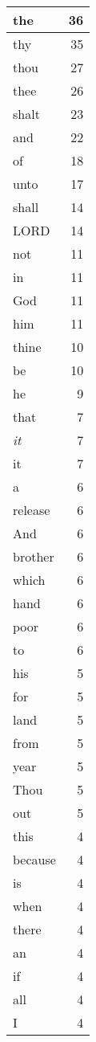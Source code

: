 \begin{center}
\begin{longtable}{l|r}
\hline \hline
\endlastfoot
the & 36 \\ \hline
thy & 35 \\ \hline
thou & 27 \\ \hline
thee & 26 \\ \hline
shalt & 23 \\ \hline
and & 22 \\ \hline
of & 18 \\ \hline
unto & 17 \\ \hline
shall & 14 \\ \hline
LORD & 14 \\ \hline
not & 11 \\ \hline
in & 11 \\ \hline
God & 11 \\ \hline
him & 11 \\ \hline
thine & 10 \\ \hline
be & 10 \\ \hline
he & 9 \\ \hline
that & 7 \\ \hline
\emph{it} & 7 \\ \hline
it & 7 \\ \hline
a & 6 \\ \hline
release & 6 \\ \hline
And & 6 \\ \hline
brother & 6 \\ \hline
which & 6 \\ \hline
hand & 6 \\ \hline
poor & 6 \\ \hline
to & 6 \\ \hline
his & 5 \\ \hline
for & 5 \\ \hline
land & 5 \\ \hline
from & 5 \\ \hline
year & 5 \\ \hline
Thou & 5 \\ \hline
out & 5 \\ \hline
this & 4 \\ \hline
because & 4 \\ \hline
is & 4 \\ \hline
when & 4 \\ \hline
there & 4 \\ \hline
an & 4 \\ \hline
if & 4 \\ \hline
all & 4 \\ \hline
I & 4 \\ \hline

\end{longtable}
\end{center}
